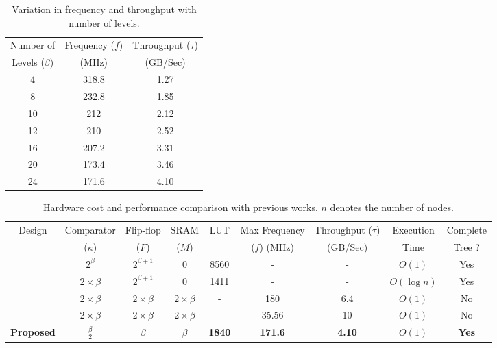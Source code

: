 \documentclass[10pt, conference, compsocconf]{IEEEtran}
\begin{document}
\begin{table}
 \begin{center}
 \caption{Variation in frequency and throughput with number of levels.}
\label{table1}
\begin{tabular}{ |c|c|c| }
 \hline
 Number of & Frequency ($f$) & Throughput ($\tau$) \\
 Levels ($\beta$) & (MHz)& (GB/Sec)\\
 \hline
 \hline
 4 & 318.8 &  1.27\\
 8 & 232.8 &  1.85\\
 10 & 212 &  2.12 \\
 12 & 210 &  2.52 \\
 16 & 207.2 &  3.31\\
 20 & 173.4 &  3.46 \\
 24 & 171.6 &  4.10\\
 \hline
\end{tabular}
\end{center}
\end{table}

\begin{table}
 \begin{center}
 \caption{Hardware cost and performance comparison with previous works. $n$ denotes the number of nodes.}
\label{table4}
\begin{tabular}{ |c|c|c|c|c|c|c|c|c| }
 \hline
 Design  & Comparator  & Flip-flop & SRAM & LUT &Max Frequency & Throughput ($\tau$) & Execution & Complete \\
  & ($\kappa$)& ($F$)& ($M$) &  & ($f$) (MHz) & (GB/Sec) & Time & Tree ?\\
 \hline
 \hline
 \cite{hw8} & $2^\beta$ & $2^{\beta +1}$& 0 & 8560 & - & - & $O(1)$ & Yes\\
 \hline
 \cite{hw11} & $2 \times \beta$ & $2^{\beta +1}$ & 0 & 1411 & - & - & $O(\log n)$ & Yes\\
 \hline
 \cite{fpga1} & $2 \times \beta$ & $2 \times \beta$ & $2 \times \beta$ & - & 180 &6.4 & $O(1)$ & No\\
 \hline
 \cite{hw2} & $2 \times \beta$ & $2 \times \beta$ & $2 \times \beta$ & - & 35.56 &10 & $O(1)$ & No\\
 \hline
{\bf Proposed} & {\bf $\frac{\beta}{2}$} & {\bf $\beta$} & {\bf $\beta$} & {\bf 1840} & {\bf 171.6} & {\bf 4.10} & {\bf $O(1)$} & {\bf Yes}\\
 \hline
\end{tabular}
\end{center}
\end{table}
\end{document}
